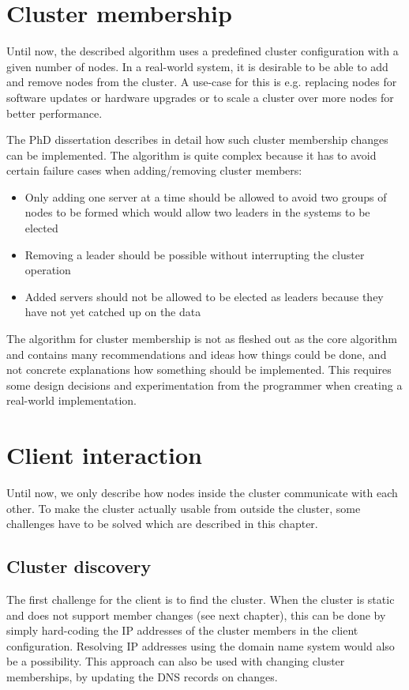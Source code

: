 \section{Cluster membership}
Until now, the described algorithm uses a predefined cluster configuration with a given number of nodes. In a real-world system, it is desirable to
be able to add and remove nodes from the cluster. A use-case for this is e.g. replacing nodes for software updates or hardware upgrades or to
scale a cluster over more nodes for better performance.

The PhD dissertation \cite{raft_phd_thesis} describes in detail how such cluster membership changes can be implemented.
The algorithm is quite complex because it has to avoid certain failure cases when adding/removing cluster members:

\begin{itemize}
    \item Only adding one server at a time should be allowed to avoid two groups of nodes to be formed which would allow two leaders in the systems to be elected
    \item Removing a leader should be possible without interrupting the cluster operation
    \item Added servers should not be allowed to be elected as leaders because they have not yet catched up on the data
\end{itemize}

The algorithm for cluster membership is not as fleshed out as the core algorithm and contains many recommendations and ideas how things could be done, and not 
concrete explanations how something should be implemented. This requires some design decisions and experimentation from the programmer when creating a real-world implementation.


\section{Client interaction}

Until now, we only describe how nodes inside the cluster communicate with each other. To make the cluster actually usable from outside the cluster, some challenges have to be solved which are described in this chapter.

\subsection{Cluster discovery}
The first challenge for the client is to find the cluster. When the cluster is static and does not support member changes (see next chapter), this can be done by simply hard-coding the IP addresses of the cluster members in the client configuration. Resolving IP addresses using the domain name system would also be a possibility. This approach can also be used with changing cluster memberships, by updating the DNS records on changes.

